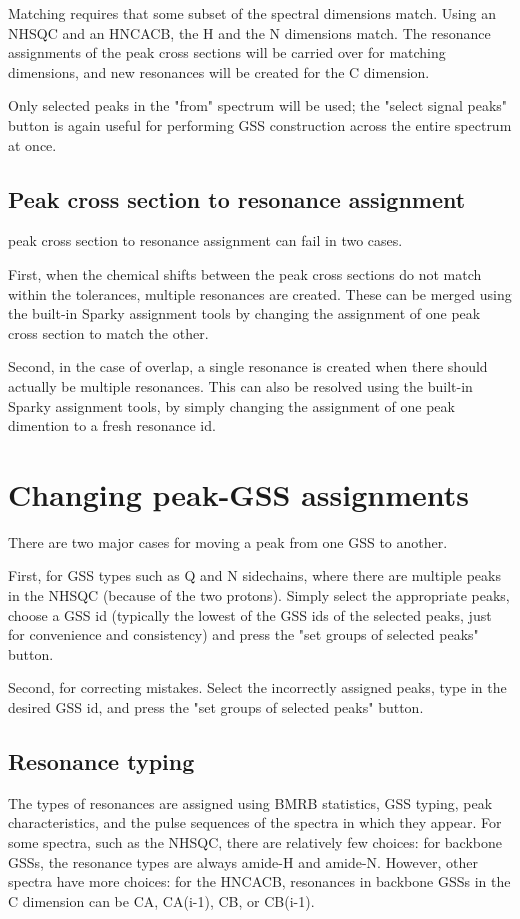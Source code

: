 Matching requires that some subset of the spectral dimensions match.  Using
an NHSQC and an HNCACB, the H and the N dimensions match.  The resonance
assignments of the peak cross sections will be carried over for matching dimensions,
and new resonances will be created for the C dimension.

Only selected peaks in the "from" spectrum will be used; the "select signal 
peaks" button is again useful for performing GSS construction across the
entire spectrum at once.

\subsection{Peak cross section to resonance assignment}
peak cross section to resonance assignment can fail in two cases.

First, when the chemical shifts between the peak cross sections do not match
within the tolerances, multiple resonances are created.  These can be merged
using the built-in Sparky assignment tools by changing the assignment of one
peak cross section to match the other.

Second, in the case of overlap, a single resonance is created when there
should actually be multiple resonances.  This can also be resolved using
the built-in Sparky assignment tools, by simply changing the assignment of
one peak dimention to a fresh resonance id.

\section{Changing peak-GSS assignments}
There are two major cases for moving a peak from one GSS to another.

First, for GSS types such as Q and N sidechains, where there are multiple
peaks in the NHSQC (because of the two protons).  Simply select the appropriate
peaks, choose a GSS id (typically the lowest of the GSS ids of the selected
peaks, just for convenience and consistency) and press the "set groups of
selected peaks" button.

Second, for correcting mistakes.  Select the incorrectly assigned peaks,
type in the desired GSS id, and press the "set groups of selected peaks" button.

\subsection{Resonance typing}
The types of resonances are assigned using BMRB statistics, GSS typing, 
peak characteristics,
and the pulse sequences of the spectra in which they appear.  For some spectra,
such as the NHSQC, there are relatively few choices: for backbone GSSs,
the resonance types are always amide-H and amide-N.  However, other spectra
have more choices: for the HNCACB, resonances in backbone GSSs in the C
dimension can be CA, CA(i-1), CB, or CB(i-1).

